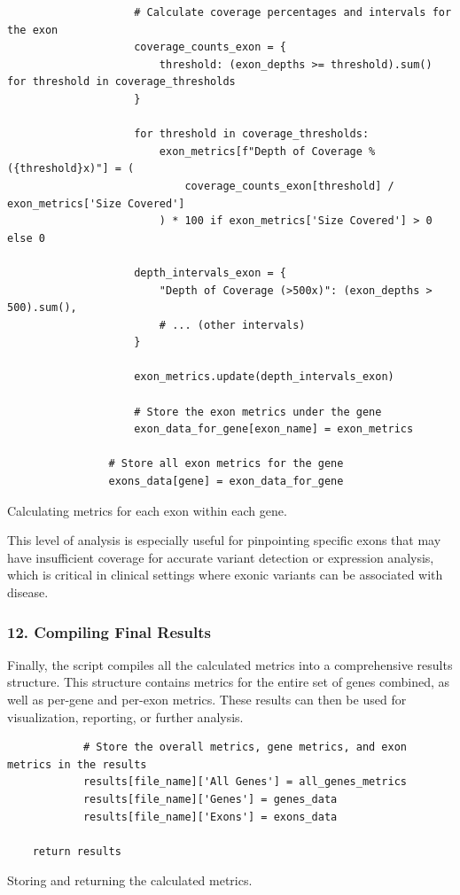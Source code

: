 \begin{longlisting}
\begin{verbatim}
                    # Calculate coverage percentages and intervals for the exon
                    coverage_counts_exon = {
                        threshold: (exon_depths >= threshold).sum() for threshold in coverage_thresholds
                    }

                    for threshold in coverage_thresholds:
                        exon_metrics[f"Depth of Coverage % ({threshold}x)"] = (
                            coverage_counts_exon[threshold] / exon_metrics['Size Covered']
                        ) * 100 if exon_metrics['Size Covered'] > 0 else 0

                    depth_intervals_exon = {
                        "Depth of Coverage (>500x)": (exon_depths > 500).sum(),
                        # ... (other intervals)
                    }

                    exon_metrics.update(depth_intervals_exon)

                    # Store the exon metrics under the gene
                    exon_data_for_gene[exon_name] = exon_metrics

                # Store all exon metrics for the gene
                exons_data[gene] = exon_data_for_gene
\end{verbatim}
\caption{Calculating metrics for each exon within each gene.}
\label{lbl:metrics_exon}
\end{longlisting}

This level of analysis is especially useful for pinpointing specific exons that may have insufficient coverage for accurate variant detection or expression analysis, which is critical in clinical settings where exonic variants can be associated with disease.

\subsubsection{12. Compiling Final Results}

Finally, the script compiles all the calculated metrics into a comprehensive results structure. This structure contains metrics for the entire set of genes combined, as well as per-gene and per-exon metrics. These results can then be used for visualization, reporting, or further analysis.

\begin{longlisting}
\begin{verbatim}
            # Store the overall metrics, gene metrics, and exon metrics in the results
            results[file_name]['All Genes'] = all_genes_metrics
            results[file_name]['Genes'] = genes_data
            results[file_name]['Exons'] = exons_data

    return results
\end{verbatim}
\caption{Storing and returning the calculated metrics.}
\label{lbl:metrics_results}
\end{longlisting}

